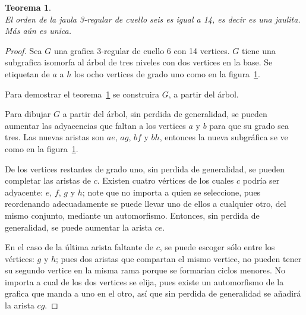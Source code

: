 \documentclass[12pt]{book}
\newtheorem{theorem}{Teorema}
\theoremstyle{definition}
\begin{document}
\begin{theorem}\textbf{}\\\label{teo(3,6)-jaula}
El orden de la jaula 3-regular de cuello seis es igual a 14, es decir
es una jaulita. Más aún es unica.  
\end{theorem}

\begin{proof}
Sea $G$ una grafica 3-regular de cuello 6 con 14 vertices. $G$ tiene
una subgrafica isomorfa al árbol de tres niveles con dos vertices en
la base. Se etiquetan de $a$ a $h$ los ocho vertices de grado uno como
en la figura~\ref{arbol(3,6)}.

Para demostrar el teorema~\ref{teo(3,6)-jaula} se construira $G$, a
partir del árbol.

Para dibujar $G$ a partir del árbol, sin perdida de generalidad, se pueden
aumentar las adyacencias que faltan a los vertices $a$ y $b$ para que
su grado sea tres. Las nuevas aristas son $ae$, $ag$, $bf$ y $bh$,
entonces la nueva subgráfica se ve como en la figura~\ref{arbol(3,6)}.

\begin{figure}
  \centering
  \caption{} \label{arbol(3,6)}
\end{figure}

De los vertices restantes de grado uno, sin perdida de generalidad, se
pueden completar las aristas de $c$. Existen cuatro vértices de los
cuales $c$ podría ser adyacente: $e$,
$f$, $g$ y $h$; note que no importa a quien se seleccione, pues
reordenando adecuadamente se puede llevar uno de ellos a cualquier
otro, del mismo conjunto, mediante un automorfismo. Entonces, sin perdida de generalidad, se
puede aumentar la arista $ce$.

En el caso de la última arista faltante de $c$,
se puede escoger sólo entre los vértices: $g$ y $h$; pues dos aristas
que compartan el
mismo vertice, no pueden tener su segundo vertice
en la misma rama porque se formarían ciclos menores.
No importa a cual de los dos vertices se elija, pues existe
un automorfismo de la grafica que manda a uno en el otro, así que sin
perdida de generalidad se añadirá la arista $cg$. 


\end{proof}
\end{document}
